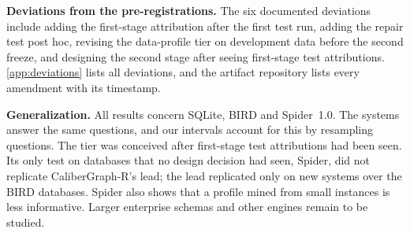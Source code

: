 \textbf{Deviations from the pre-registrations.} The six documented deviations include adding the first-stage attribution after the first test run, adding the repair test post hoc, revising the data-profile tier on development data before the second freeze, and designing the second stage after seeing first-stage test attributions. \ref{app:deviations} lists all deviations, and the artifact repository lists every amendment with its timestamp.

\textbf{Generalization.} All results concern SQLite, BIRD and Spider~1.0. The systems answer the same questions, and our intervals account for this by resampling questions. The tier was conceived after first-stage test attributions had been seen. Its only test on databases that no design decision had seen, Spider, did not replicate CaliberGraph-R's lead; the lead replicated only on new systems over the BIRD databases. Spider also shows that a profile mined from small instances is less informative. Larger enterprise schemas and other engines remain to be studied.
